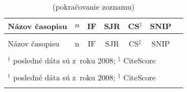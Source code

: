 {\small
\begin{longtable}[c]{lcccccc}
  \toprule\noalign{\vspace{.3ex}}
  Názov časopisu & $n$ & IF & SJR & CS$^\ddagger$ & SNIP \\[0.3ex]
  \midrule\noalign{\vspace{.5ex}}
  \endfirsthead

  \caption*{(pokračovanie zoznamu)} \\
  \toprule\noalign{\vspace{.3ex}}
  Názov časopisu & n & IF & SJR & CS$^\ddagger$ & SNIP \\[0.3ex]
  \midrule\noalign{\vspace{.5ex}}
  \endhead

  \bottomrule \\[-2ex]
  \multicolumn{7}{l}{\footnotesize $^\dagger$ posledné dáta sú z~roku 2008; $^\ddagger$ CiteScore} \\
  \endfoot

  \bottomrule \\[-2ex]
  \multicolumn{7}{l}{\footnotesize $^\dagger$ posledné dáta sú z~roku 2008; $^\ddagger$ CiteScore} \\
  \endlastfoot


\end{longtable}}
